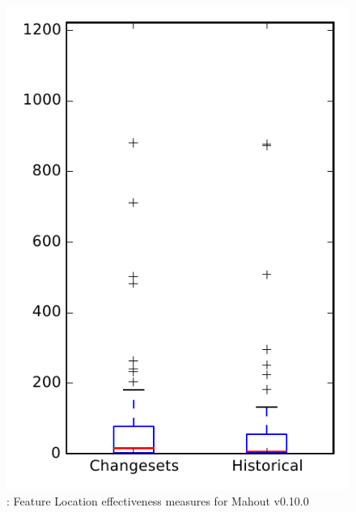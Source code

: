 
\begin{figure}
\centering
\includegraphics[height=0.4\textheight]{figures/flt/rq2_mahout}
\caption{\ftwo: Feature Location effectiveness measures for Mahout v0.10.0}
\label{fig:flt:rq2:mahout}
\end{figure}

